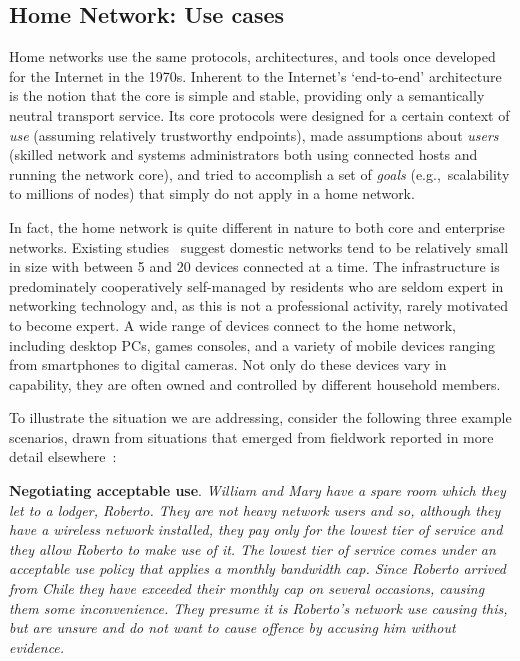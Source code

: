 \subsection{Home Network: Use cases}

Home networks use the same protocols, architectures, and tools once developed for the
Internet in the 1970s.  Inherent to the Internet's `end-to-end' architecture
is the notion that the core is simple and stable, providing only a semantically
neutral transport service.  Its core protocols were designed for a certain
context of \emph{use} (assuming relatively trustworthy endpoints), made
assumptions about \emph{users} (skilled network and systems administrators both
using connected hosts and running the network core), and tried to accomplish a
set of \emph{goals} (e.g.,~scalability to millions of nodes) that simply do not
apply in a home network. 

In fact, the home network is quite different in nature to both core and
enterprise networks.  Existing studies~\cite{tolmie07,shehan07,shehanpoole08}
suggest domestic networks tend to be relatively small in size with between 5 and
20 devices connected at a time.  The infrastructure is predominately
cooperatively self-managed by residents who are seldom expert in networking
technology and, as this is not a professional activity, rarely motivated to
become expert.  A wide range of devices connect to the home network, including
desktop PCs, games consoles, and a variety of mobile devices ranging from
smartphones to digital cameras.  Not only do these devices vary in capability,
they are often owned and controlled by different household members.  

To illustrate the situation we are addressing, consider the following three
example scenarios, drawn from  situations that emerged from fieldwork 
reported in more detail elsewhere~\cite{wmust2011,Chetty10}: 
 
\textbf{Negotiating acceptable use}.  {\it William and Mary have a spare room
  which they let to a lodger, Roberto.  They are not heavy network users and so,
  although they have a wireless network installed, they pay only for the lowest
  tier of service and they allow Roberto to make use of it.  The lowest tier of
  service comes under an acceptable use policy that applies a monthly bandwidth
  cap.  Since Roberto arrived from Chile they have exceeded their monthly cap on
  several occasions, causing them some inconvenience.  They presume it is
  Roberto's network use causing this, but are unsure and do not want to cause
  offence by accusing him without evidence.}

